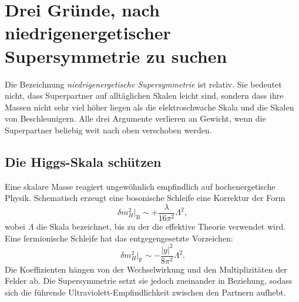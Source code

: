 \section{Drei Gründe, nach niedrigenergetischer Supersymmetrie zu suchen}

\begin{classroomqa}
\end{classroomqa}

Die Bezeichnung \emph{niedrigenergetische Supersymmetrie} ist relativ. Sie bedeutet nicht, dass Superpartner auf alltäglichen Skalen leicht sind, sondern dass ihre Massen nicht sehr viel höher liegen als die elektroschwache Skala und die Skalen von Beschleunigern. Alle drei Argumente verlieren an Gewicht, wenn die Superpartner beliebig weit nach oben verschoben werden.

\subsection{Die Higgs-Skala schützen}

Eine skalare Masse reagiert ungewöhnlich empfindlich auf hochenergetische Physik. Schematisch erzeugt eine bosonische Schleife eine Korrektur der Form
\begin{equation}
\delta m_H^2\big|_{\mathrm B}
\sim +\frac{\lambda}{16\pi^2}\Lambda^2,
\end{equation}
wobei \(\Lambda\) die Skala bezeichnet, bis zu der die effektive Theorie verwendet wird. Eine fermionische Schleife hat das entgegengesetzte Vorzeichen:
\begin{equation}
\delta m_H^2\big|_{\mathrm F}
\sim -\frac{|y|^2}{8\pi^2}\Lambda^2.
\end{equation}
Die Koeffizienten hängen von der Wechselwirkung und den Multiplizitäten der Felder ab. Die Supersymmetrie setzt sie jedoch zueinander in Beziehung, sodass sich die führende Ultraviolett-Empfindlichkeit zwischen den Partnern aufhebt.

